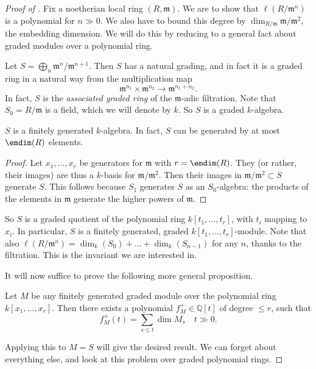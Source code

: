 \begin{proof}[Proof of  ]
Fix a noetherian local ring $(R, \mathfrak{m})$. We are to show that
$\ell(R/\mathfrak{m}^n)$ is a polynomial for $n \gg 0$. We also have to bound
this degree by $\dim_{R/\mathfrak{m}} \mathfrak{m}/\mathfrak{m}^2$, the
embedding dimension. We will do this by reducing to a general fact about
graded modules over a polynomial ring.

Let $S = \bigoplus_n  \mathfrak{m}^n/\mathfrak{m}^{n+1}$. Then $S$ has a
natural grading, and in fact it is a graded ring in a natural way from the
multiplication map 
\[ \mathfrak{m}^{n_1} \times \mathfrak{m}^{n_2} \to \mathfrak{m}^{n_1 + n_2}.  \]
In fact, $S$ is the \emph{associated graded ring} of the $\mathfrak{m}$-adic filtration.
Note that $S_0 = R/\mathfrak{m}$ is a field, which we will denote by  $k$.
So $S$ is a graded $k$-algebra.

\begin{lemma} 
$S$ is a finitely generated $k$-algebra. In fact, $S$ can be generated by at
most $\emdim(R)$ elements.
\end{lemma} 
\begin{proof} 
Let $x_1, \dots, x_r$ be generators for $\mathfrak{m} $ with $r = \emdim(R)$.
They  (or rather, their images) are thus a $k$-basis
for $\mathfrak{m}/\mathfrak{m}^2$.
Then their images in $\mathfrak{m}/\mathfrak{m}^2 \subset S$ generate $S$.
This follows because $S_1$ generates $S$ as an $S_0$-algebra: the products of
the elements in $\mathfrak{m}$ generate the higher powers of $\mathfrak{m}$.
\end{proof} 

So $S$ is a graded quotient of the polynomial ring $k[t_1, \dots, t_r]$, with
$t_i $ mapping to $x_i$. In particular, $S$ is a finitely generated, graded $k[t_1,
\dots, t_r]$-module.
Note that also $\ell(R/\mathfrak{m}^n)  = \dim_{k}(S_0) + \dots +
\dim_{k}(S_{n-1})$ for any $n$, thanks to the filtration. This is the
invariant we are interested in.

It will now suffice to prove the following more general proposition.
\begin{proposition} \label{hilbfngeneral}
Let $M$ be any finitely generated graded module over the polynomial ring
$k[x_1, \dots, x_r]$. Then
there exists a polynomial $f_M^+ \in \mathbb{Q}[t]$ of degree $ \leq r$, such that
\[ f_M^+(t) = \sum_{s \leq t} \dim M_s \quad t \gg 0.   \]
\end{proposition} 
Applying this to $M = S$ will give the desired result. We can forget about
everything else, and look at this problem over graded polynomial rings.


\end{proof}

